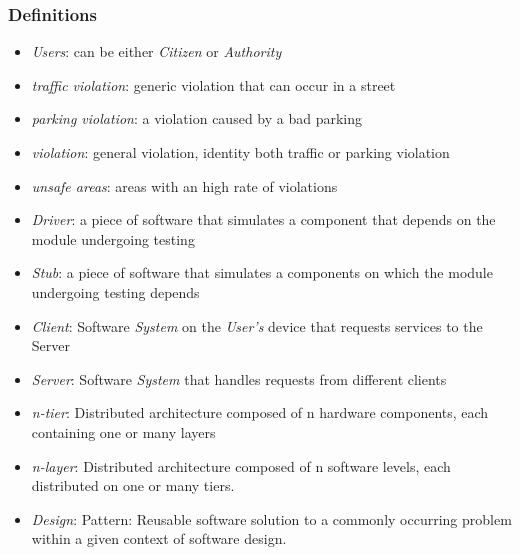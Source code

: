 \documentclass{article}
\begin{document}
\subsubsection{Definitions}
\begin{itemize}
    \item \textit{Users}: can be either \textit{Citizen} or \textit{Authority}
    \item \textit{traffic violation}: generic violation that can occur in a street
    \item \textit{parking violation}: a violation caused by a bad parking
    \item \textit{violation}: general violation, identity both traffic or parking violation
    \item \textit{unsafe areas}: areas with an high rate of violations
    \item \textit{Driver}: a piece of software that simulates a component that depends on the module undergoing testing
    \item \textit{Stub}: a piece of software that simulates a components on which the module undergoing testing depends
    \item \textit{Client}: Software \textit{System} on the \textit{User's} device that requests services to the Server
    \item \textit{Server}: Software \textit{System} that handles requests from different clients
    \item \textit{n-tier}: Distributed architecture composed of n hardware components, each containing one or many layers
    \item \textit{n-layer}: Distributed architecture composed of n software levels, each distributed on one or many tiers.
    \item \textit{Design}: Pattern: Reusable software solution to a commonly occurring problem within a given context of software design.
\end{itemize}
\end{document}
